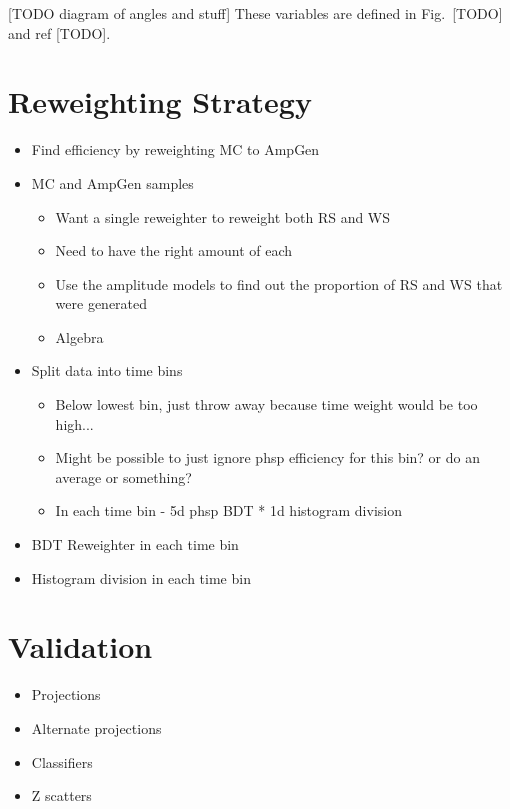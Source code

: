 \documentclass[note.tex]{subfiles}
\begin{document}
[TODO diagram of angles and stuff] These variables are defined in Fig.~[TODO] and ref [TODO].


\section{Reweighting Strategy}
\begin{itemize}
    \item Find efficiency by reweighting MC to AmpGen
    \item MC and AmpGen samples
          \begin{itemize}
              \item Want a single reweighter to reweight both RS and WS
              \item Need to have the right amount of each
              \item Use the amplitude models to find out the proportion of RS and WS that were generated
              \item Algebra
          \end{itemize}
    \item Split data into time bins
          \begin{itemize}
              \item Below lowest bin, just throw away because time weight would be too high...
              \item Might be possible to just ignore phsp efficiency for this bin? or do an average or something?
              \item In each time bin - 5d phsp BDT * 1d histogram division
          \end{itemize}
    \item BDT Reweighter in each time bin
    \item Histogram division in each time bin
\end{itemize}

\section{Validation}
\begin{itemize}
    \item Projections
    \item Alternate projections
    \item Classifiers
    \item Z scatters
\end{itemize}
\end{document}
